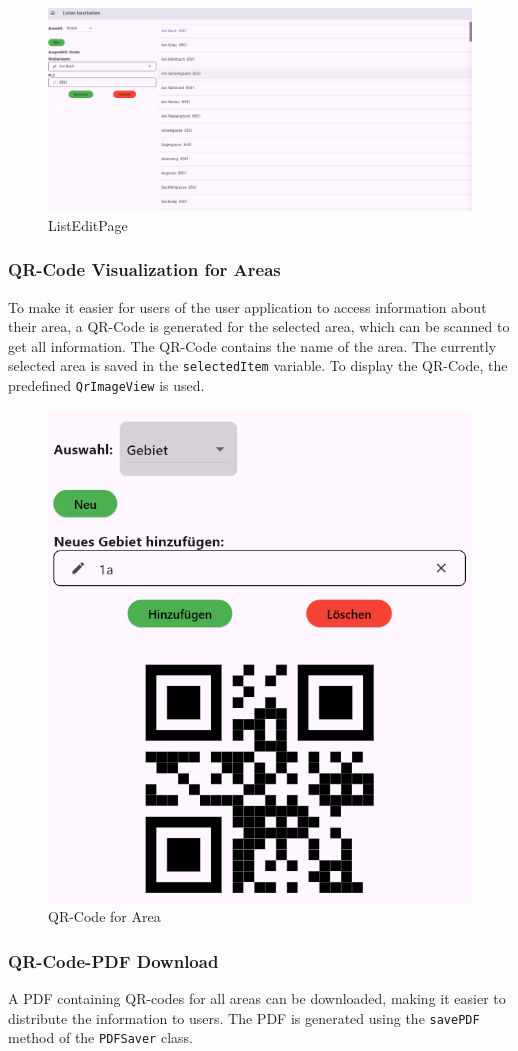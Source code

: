 \begin{figure}[H]
    \centering
    \includegraphics[width=0.9\linewidth]{images/AdminPanel/ListEditPage.png}
    \caption{ListEditPage}
\end{figure}

\subsubsection{QR-Code Visualization for Areas}
To make it easier for users of the user application to access information about their area, a QR-Code is generated for the selected area, which can be scanned to get all information. The QR-Code contains the name of the area. The currently selected area is saved in the \texttt{selectedItem} variable. To display the QR-Code, the predefined \texttt{QrImageView} is used.

\begin{figure}[H]
    \centering
    \includegraphics[width=0.4\linewidth]{images/AdminPanel/QrImageView.png}
    \caption{QR-Code for Area}
\end{figure}

\subsubsection{QR-Code-PDF Download}
A PDF containing  QR-codes for all areas can be downloaded, making it easier to distribute the information to users. The PDF is generated using the \texttt{savePDF} method of the \texttt{PDFSaver} class.\\

